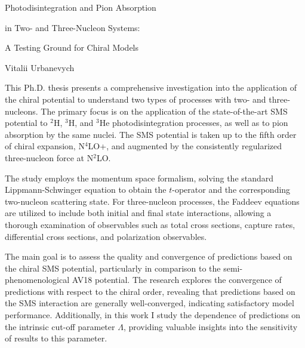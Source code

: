 \documentclass[a4paper, 14pt]{extarticle}
\begin{document}

\Large
 \begin{center}
    Photodisintegration and Pion Absorption
    
    in Two- and Three-Nucleon Systems:
    
    A Testing Ground for Chiral Models

\hspace{10pt}

\large
Vitalii Urbanevych \\

\hspace{10pt}


\end{center}

\hspace{10pt}

\normalsize

This Ph.D. thesis presents a comprehensive investigation into the application of the chiral potential to understand two types of processes with two- and three-nucleons.
The primary focus is on the application of 
the state-of-the-art SMS potential to $^2$H, $^3$H, and $^3$He photodisintegration processes,
as well as to pion absorption by the same nuclei.
The SMS potential is taken up to the fifth order of chiral expansion, N$^4$LO+, and augmented by the consistently regularized three-nucleon force at N$^2$LO.

The study employs the momentum space formalism, solving the standard Lippmann-Schwinger equation to obtain the $t$-operator and the corresponding two-nucleon scattering state. For three-nucleon processes, the Faddeev equations are utilized to include both initial and final state interactions, allowing a thorough examination of observables such as total cross sections, capture rates, differential cross sections, and polarization observables.

The main goal is to assess the quality and convergence of predictions based on the chiral SMS potential, particularly in comparison to the semi-phenomenological AV18 potential. The research explores the convergence of predictions with respect to the chiral order, revealing that predictions based on the SMS interaction are generally well-converged, indicating satisfactory model performance. Additionally, in this work I study the dependence of predictions on the intrinsic cut-off parameter $\Lambda$, providing valuable insights into the sensitivity of results to this parameter.
\end{document}
